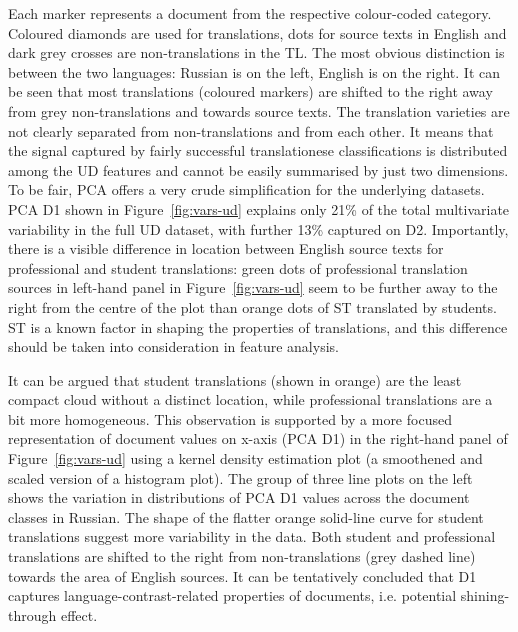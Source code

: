 Each marker represents a document from the respective colour-coded category. Coloured diamonds are used for translations, dots for source texts in English and dark grey crosses are non-translations in the TL. 
The most obvious distinction is between the two languages: Russian is on the left, English is on the right. 
It can be seen that most translations (coloured markers) are shifted to the right away from grey non-translations and towards source texts. 
The translation varieties are not clearly separated from non-translations and from each other. It means that the signal captured by fairly successful translationese classifications is distributed among the UD features and cannot be easily summarised by just two dimensions.
To be fair, PCA offers a very crude simplification for the underlying datasets. PCA D1 shown in Figure~\ref{fig:vars-ud} explains only 21\% of the total multivariate variability in the full UD dataset, with further 13\% captured on D2. 
Importantly, there is a visible difference in location between English source texts for professional and student translations: green dots of professional translation sources in left-hand panel in Figure~\ref{fig:vars-ud} seem to be further away to the right from the centre of the plot than orange dots of ST translated by students. ST is a known factor in shaping the properties of translations, and this difference should be taken into consideration in feature analysis. 

It can be argued that student translations (shown in orange) are the least compact cloud without a distinct location, while professional translations are a bit more homogeneous. This observation is supported by a more focused representation of document values on x-axis (PCA D1) in the right-hand panel of Figure~\ref{fig:vars-ud} using a kernel density estimation plot (a smoothened and scaled version of a histogram plot). The group of three line plots on the left shows the variation in distributions of PCA D1 values across the document classes in Russian. The shape of the flatter orange solid-line curve for student translations suggest more variability in the data. Both student and professional translations are shifted to the right from non-translations (grey dashed line) towards the area of English sources. It can be tentatively concluded that D1 captures language-contrast-related properties of documents, i.e. potential shining-through effect.

